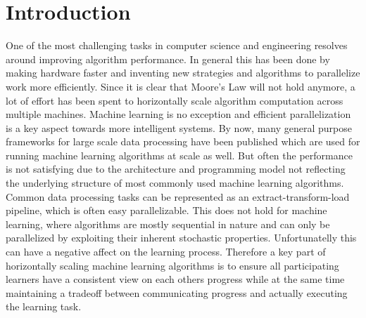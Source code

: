 \chapter{Introduction}
One of the most challenging tasks in computer science and engineering resolves around improving algorithm performance.
In general this has been done by making hardware faster and inventing new strategies and algorithms to parallelize work more efficiently.
Since it is clear that Moore's Law will not hold anymore, a lot of effort has been spent to horizontally scale algorithm computation across multiple machines.
Machine learning is no exception and efficient parallelization is a key aspect towards more intelligent systems.
By now, many general purpose frameworks for large scale data processing have been published which are used for running machine learning algorithms at scale as well.
But often the performance is not satisfying due to the architecture and programming model not reflecting the underlying structure of most commonly used machine learning algorithms.
Common data processing tasks can be represented as an extract-transform-load pipeline, which is often easy parallelizable. This does not hold for machine learning, where algorithms are mostly sequential in nature and can only be parallelized by exploiting their inherent stochastic properties.
Unfortunatelly this can have a negative affect on the learning process.
Therefore a key part of horizontally scaling machine learning algorithms is to ensure all participating learners have a consistent view on each others progress while at the same time maintaining a tradeoff between communicating progress and actually executing the learning task.



